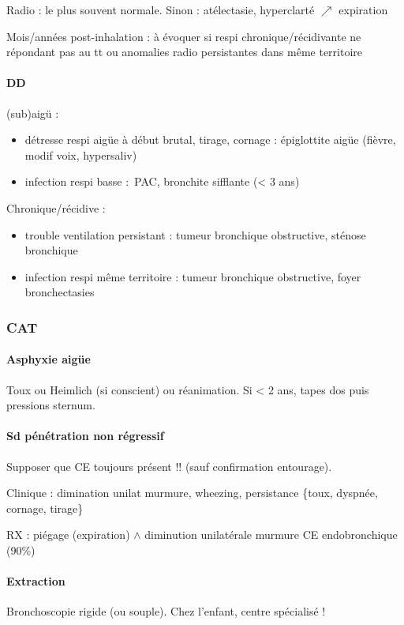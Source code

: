 \documentclass[11pt]{article}
\begin{document}
Radio : le plus souvent normale. Sinon : atélectasie, hyperclarté \(\nearrow\)
expiration

Mois/années post-inhalation : à évoquer si respi chronique/récidivante ne
répondant pas au tt ou anomalies radio persistantes dans même territoire

\paragraph{DD}
\label{sec:orgf6c9b7f}
(sub)aigü : 

\begin{itemize}
\item détresse respi aigüe à début brutal, tirage, cornage : épiglottite aigüe
(fièvre, modif voix, hypersaliv)
\item infection respi basse : PAC, bronchite sifflante (< 3 ans)
\end{itemize}

Chronique/récidive :

\begin{itemize}
\item trouble ventilation persistant : tumeur bronchique obstructive, sténose
bronchique
\item infection respi même territoire : tumeur bronchique obstructive, foyer
bronchectasies
\end{itemize}


\subsubsection{CAT}
\label{sec:org57ee088}
\paragraph{Asphyxie aigüe}
\label{sec:org68eb853}
Toux ou Heimlich (si conscient) ou réanimation. Si < 2 ans, tapes dos puis
pressions sternum.
\paragraph{Sd pénétration non régressif}
\label{sec:org226af06}
Supposer que CE toujours présent !! (sauf confirmation entourage). 

Clinique : dimination unilat murmure, wheezing, persistance \{toux, dyspnée,
  cornage, tirage\}

RX  : piégage (expiration) \(\wedge\) diminution unilatérale murmure \thus CE
endobronchique (90\%)

\paragraph{Extraction}
\label{sec:org8d699c5}
Bronchoscopie rigide (ou souple). Chez l'enfant, centre spécialisé !
\end{document}

